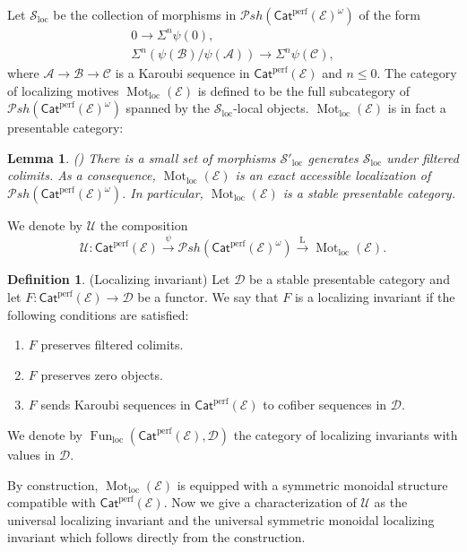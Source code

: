 \documentclass{article}
\newtheorem{lm}[thm]{Lemma}
\theoremstyle{definition}
\newtheorem{defn}[thm]{Definition}
\newcommand{\on}{\operatorname}
\begin{document}
Let $\mathcal{S}_{\on{loc}}$ be the collection of morphisms in $\mathcal{P}sh(\mathsf{Cat}^{\on{perf}}(\mathcal{E})^\omega)$ of the form
\[
\begin{gathered}
0 \rightarrow \Sigma^n \psi(0), \\
\Sigma^n(\psi(\mathcal{B}) / \psi(\mathcal{A})) \rightarrow \Sigma^n \psi(\mathcal{C}),
\end{gathered}
\]
where $\mathcal{A} \rightarrow \mathcal{B} \rightarrow \mathcal{C}$ is a Karoubi sequence in $\mathsf{Cat}^{\on{perf}}(\mathcal{E})$ and $n \leq 0$. The category of localizing motives $\on{Mot}_{\on{loc}}(\mathcal{E})$ is defined to be the full subcategory of $\mathcal{P}sh(\mathsf{Cat}^{\on{perf}}(\mathcal{E})^\omega)$ spanned by the $\mathcal{S}_{\on{loc}}$-local objects. $\on{Mot}_{\on{loc}}(\mathcal{E})$ is in fact a presentable category:
\begin{lm}(\cite[Proposition 5.15]{HSS})
There is a small set of morphisms $\mathcal{S}'_{\on{loc}}$ generates $\mathcal{S}_{\on{loc}}$ under filtered colimits. As a consequence, $\on{Mot}_{\on{loc}}(\mathcal{E})$ is an exact accessible localization of $\mathcal{P}sh(\mathsf{Cat}^{\on{perf}}(\mathcal{E})^\omega)$. In particular, $\on{Mot}_{\on{loc}}(\mathcal{E})$ is a stable presentable category. 
\end{lm}
We denote by $\mathcal{U}$ the composition\[
\mathcal{U}: \mathsf{Cat}^{\on{perf}}(\mathcal{E}) \xrightarrow{\psi} \mathcal{P}sh(\mathsf{Cat}^{\on{perf}}(\mathcal{E})^\omega)\xrightarrow {\on{L}} \on{Mot}_{\on{loc}}(\mathcal{E}).
\]
\begin{defn}(Localizing invariant)
Let $\mathcal{D}$ be a stable presentable category and let $F: \mathsf{Cat}^{\on{perf}}(\mathcal{E})\rightarrow \mathcal{D}$ be a functor. We say that $F$ is a localizing invariant if the following conditions are satisfied:
\begin{enumerate}
\item $F$ preserves filtered colimits.
\item $F$ preserves zero objects.
\item $F$ sends Karoubi sequences in $\mathsf{Cat}^{\on{perf}}(\mathcal{E})$ to cofiber sequences in $\mathcal{D}$.
\end{enumerate}
We denote by $\on{Fun}_{\on{loc}}(\mathsf{Cat}^{\on{perf}}(\mathcal{E}), \mathcal{D})$ the category of localizing invariants with values in $\mathcal{D}$.
\end{defn}
By construction, $\on{Mot}_{\on{loc}}(\mathcal{E})$ is equipped with a symmetric monoidal structure compatible with $\mathsf{Cat}^{\on{perf}}(\mathcal{E})$. Now we give a characterization of $\mathcal{U}$ as the universal localizing invariant and the universal symmetric monoidal localizing invariant which follows directly from the construction.
\end{document}
